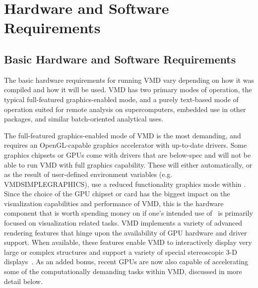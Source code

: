 %
%
%

\chapter{Hardware and Software Requirements}
\label{chapter:requirements:ug}

\section{Basic Hardware and Software Requirements}
The basic hardware requirements for running VMD vary depending on 
how it was compiled and how it will be used.  VMD has two primary
modes of operation, the typical full-featured graphics-enabled mode, 
and a purely text-based mode of operation suited for remote analysis
on supercomputers, embedded use in other packages, and similar 
batch-oriented analytical uses.  

The full-featured graphics-enabled mode of VMD is the most demanding,
and requires an OpenGL-capable graphics accelerator with up-to-date 
drivers.  Some graphics chipsets or GPUs come with drivers that are
below-spec and will not be able to run VMD with full graphics capability.
These will either automatically, or as the result of 
user-defined environment variables (e.g. VMDSIMPLEGRAPHICS), 
use a reduced functionality graphics mode within \VMD.
Since the choice of the GPU chipset or card has the biggest
impact on the visualization capabilities and performance of VMD,
this is the hardware component that is worth spending money on 
if one's intended use of \VMD\ is primarily focused on visualization related
tasks.  VMD implements a variety of advanced rendering features that 
hinge upon the availability of GPU hardware and driver 
support.  When available, these features enable VMD to interactively
display very large or complex structures and support a variety of special
stereoscopic 3-D 
displays~\cite{HUMP96,SHAR96,SHAR2000,CROS2009-JS,STON2010A,STON2011B}.
As an added bonus, recent GPUs are now also capable of accelerating
some of the computationally demanding tasks within VMD, discussed
in more detail below.

